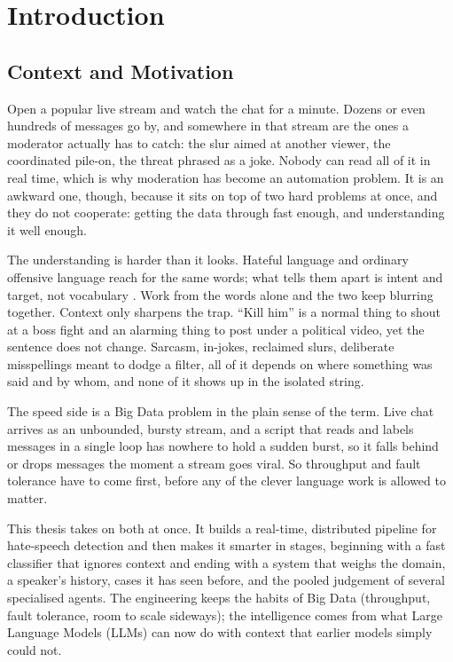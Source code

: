 \chapter{Introduction}\label{introduction}

\section{Context and Motivation}\label{context-and-motivation}

Open a popular live stream and watch the chat for a minute. Dozens or even hundreds of messages go by, and somewhere in that stream are the ones a moderator actually has to catch: the slur aimed at another viewer, the coordinated pile-on, the threat phrased as a joke. Nobody can read all of it in real time, which is why moderation has become an automation problem. It is an awkward one, though, because it sits on top of two hard problems at once, and they do not cooperate: getting the data through fast enough, and understanding it well enough.

The understanding is harder than it looks. Hateful language and ordinary offensive language reach for the same words; what tells them apart is intent and target, not vocabulary \citep{davidson2017}. Work from the words alone and the two keep blurring together. Context only sharpens the trap. ``Kill him'' is a normal thing to shout at a boss fight and an alarming thing to post under a political video, yet the sentence does not change. Sarcasm, in-jokes, reclaimed slurs, deliberate misspellings meant to dodge a filter, all of it depends on where something was said and by whom, and none of it shows up in the isolated string.

The speed side is a Big Data problem in the plain sense of the term. Live chat arrives as an unbounded, bursty stream, and a script that reads and labels messages in a single loop has nowhere to hold a sudden burst, so it falls behind or drops messages the moment a stream goes viral. So throughput and fault tolerance have to come first, before any of the clever language work is allowed to matter.

This thesis takes on both at once. It builds a real-time, distributed pipeline for hate-speech detection and then makes it smarter in stages, beginning with a fast classifier that ignores context and ending with a system that weighs the domain, a speaker's history, cases it has seen before, and the pooled judgement of several specialised agents. The engineering keeps the habits of Big Data (throughput, fault tolerance, room to scale sideways); the intelligence comes from what Large Language Models (LLMs) can now do with context that earlier models simply could not.

